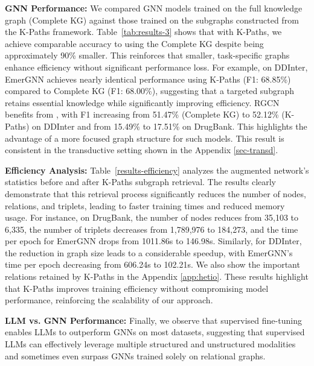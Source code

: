 \textbf{GNN Performance:} We compared GNN models trained on the full knowledge graph (Complete KG) against those trained on the subgraphs constructed from the K-Paths framework.  Table~\ref{tab:results-3} shows that with K-Paths, we achieve comparable accuracy to using the Complete KG despite being approximately 90\% smaller.
This reinforces that smaller, task-specific graphs enhance efficiency without significant performance loss.
For example, on DDInter, EmerGNN achieves nearly identical performance using K-Paths (F1: 68.85\%) compared to Complete KG (F1: 68.00\%), suggesting that a targeted subgraph retains essential knowledge while significantly improving efficiency.
RGCN benefits from \sys, with F1 increasing from 51.47\% (Complete KG) to 52.12\% (K-Paths) on DDInter and from 15.49\% to 17.51\% on DrugBank.
This highlights the advantage of a more focused graph structure for such models. This result is consistent in the transductive setting shown in the Appendix \ref{sec-transd}.


\textbf{Efficiency Analysis:}  Table~\ref{results-efficiency} analyzes the augmented network's statistics before and after K-Paths subgraph retrieval.
The results clearly demonstrate that this retrieval process significantly reduces the number of nodes, relations, and triplets, leading to faster training times and reduced memory usage.
For instance, on DrugBank, the number of nodes reduces from 35,103 to 6,335, the number of triplets decreases from 1,789,976 to 184,273, and the time per epoch for EmerGNN drops from 1011.86s to 146.98s.
Similarly, for DDInter, the reduction in graph size leads to a considerable speedup, with EmerGNN's time per epoch decreasing from 606.24s to 102.21s. We also show the important relations retained by K-Paths in the Appendix \ref{app:hetio}.
These results highlight that K-Paths improves training efficiency without compromising model performance, reinforcing the scalability of our approach. 

\textbf{LLM vs. GNN Performance:} Finally, we observe that supervised fine-tuning enables LLMs to outperform GNNs on most datasets, suggesting that supervised LLMs can effectively leverage multiple structured and unstructured modalities and sometimes even surpass GNNs trained solely on relational graphs.
